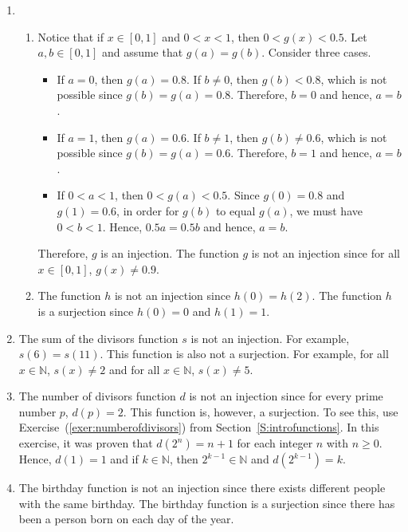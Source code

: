 \begin{enumerate}
\item \begin{enumerate}
\item Notice that if $x \in [0, 1]$ and $0 < x < 1$, then $0 < g(x) < 0.5$.
Let $a, b \in [0,1]$ and assume that $g(a) = g(b)$.  Consider three cases.
\begin{itemize}
\item If $a = 0$, then $g(a) = 0.8$.  If $b \ne 0$, then $g(b) < 0.8$, which is not possible since $g(b) = g(a) =0.8$.  Therefore, $b = 0$ and hence, $a = b$.

\item If $a = 1$, then $g(a) = 0.6$.  If $b \ne 1$, then $g(b) \ne 0.6$, which is not possible since $g(b) = g(a) =0.6$.  Therefore, $b = 1$ and hence, $a = b$.

\item If $0 < a < 1$, then $0 < g(a) < 0.5$.  Since $g(0) = 0.8$ and $g(1) = 0.6$, in order for $g(b)$ to equal $g(a)$, we must have $0 < b < 1$.  Hence, $0.5a = 0.5b$ and hence, $a = b$.
\end{itemize}
Therefore, $g$ is an injection. The function $g$ is not an injection since for all 
$x \in [0, 1]$, $g(x) \ne 0.9$.

\item The function $h$ is not an injection since $h(0) = h(2)$.  The function $h$ is a surjection since $h(0) = 0$ and $h(1) = 1$.
\end{enumerate}



\item The sum of the divisors function $s$ is not an injection.  For example, 
$s ( 6 ) = s ( 11 )$.  This function is also not a surjection.  For example, for all 
$x \in \mathbb{N}$, $s ( x ) \ne 2$ and for all  
$x \in \mathbb{N}$, $s ( x ) \ne 5$.



\item The number of divisors function $d$ is not an injection since for every prime number $p$, $d ( p ) = 2$.  This function is, however, a surjection.  To see this, use 
Exercise~(\ref{exer:numberofdivisors}) from Section~\ref{S:introfunctions}.  In this exercise, it was proven that $d ( 2^n ) = n + 1$ for each integer $n$ with $n \geq 0$.  Hence, $d ( 1 ) = 1$ and if $k \in \mathbb{N}$, then $2^{k-1} \in \mathbb{N}$ and 
$d ( 2^{k-1} ) = k$.



\item The birthday function is not an injection since there exists different people with the same birthday.  The birthday function is a surjection since there has been a person born on each day of the year.


\end{enumerate}
